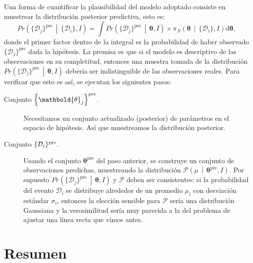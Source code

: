 \documentclass[a4paper,twoside]{article}
\newcommand{\hip}{\ensuremath{\mathbold{\theta}}\xspace}
\newcommand{\dat}[1][i]{\ensuremath{\{\mathcal{D}_{#1}\}}\xspace}
\newcommand{\pos}[2]{\ensuremath{\pi_N\left(#1\,\middle|\, #2\right)}\xspace}
\newcommand{\pro}[2]{\ensuremath{Pr\left(#1\,\middle|\, #2\right)}\xspace}
\newcommand{\set}[1]{\ensuremath{\left\{#1\right\}}\xspace}
\begin{document}
Una forma de cuantificar la plausibilidad del modelo adoptado consiste en muestrear la distribución
posterior predictiva, esto es:
%
\begin{equation}
\pro{\dat[j]^\text{pre}}{\dat,I} = \int\pro{\dat[j]^\text{pre}}{\hip,I}\times\pos{\hip}{\dat,I}\text{d}\hip,
\end{equation}
%
donde el primer factor dentro de la integral es la probabilidad de haber observado
$\dat[j]^\text{pre}$ dada la hipótesis. La premisa es que si el modelo es descriptivo de las
observaciones en su completitud, entonces una muestra tomada de la distribución
$\pro{\dat[j]^\text{pre}}{\hip,I}$ debería ser indistinguible de las observaciones reales. Para
verificar que esto es así, se ejecutan los siguientes pasos:
%
\begin{description}
%
\item[Conjunto $\set{\hip_j}^{\rm pre}$.] Necesitamos un conjunto actualizado (posterior) de
parámetros en el espacio de hipótesis. Así que muestreamos la distribución posterior.
%
\item[Conjunto $\dat^{\rm pre}$.] Usando el conjunto $\hip^\text{pre}$ del paso anterior, se
construye un conjunto de observaciones predichas, muestreando la distribución
$\mathcal{P}\left(\mu\,\middle|\,\hip^\text{pre},I\right)$. Por supuesto
$\pro{\dat[j]^\text{pre}}{\hip,I}$ y $\mathcal{P}$ deben ser consistentes: si la probabilidad del
evento $\mathcal{D}_i$ se distribuye alrededor de un promedio $\mu_i$ con desviación estándar
$\sigma_i$, entonces la elección sensible para $\mathcal{P}$ sería una distribución Gaussiana y la
verosimilitud sería muy parecida a la del problema de ajustar una línea recta que vimos antes.
%
\end{description}


\section*{Resumen}
\end{document}
